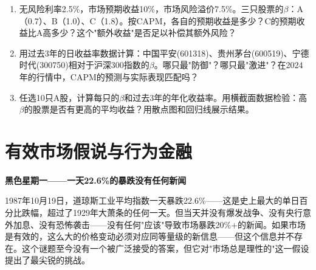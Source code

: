 \documentclass[a4paper,11pt]{ctexbook}
\begin{document}
{\begin{lessonsummary}
\begin{exercises}
\begin{enumerate}
  \item 无风险利率2.5\%，市场预期收益10\%，市场风险溢价7.5\%。三只股票的$\beta$：A（0.7）、B（1.0）、C（1.8）。按CAPM，各自的预期收益是多少？C的预期收益比A高多少？这个"额外收益"是否足以补偿其额外风险？
  \item 用过去3年的日收益率数据计算：中国平安(601318)、贵州茅台(600519)、宁德时代(300750)相对于沪深300指数的$\beta$。哪只最"防御"？哪只最"激进"？在2024年的行情中，CAPM的预测与实际表现匹配吗？
  \item 任选10只A股，计算每只的$\beta$和过去3年的年化收益率。用横截面数据检验：高$\beta$的股票是否有更高的平均收益？用散点图和回归线展示结果。
\end{enumerate}
\end{exercises}


\newpage
\chapter{有效市场假说与行为金融}

\begin{scenario}
\textbf{黑色星期一——一天22.6\%的暴跌没有任何新闻}

1987年10月19日，道琼斯工业平均指数一天暴跌22.6\%——这是史上最大的单日百分比跌幅，超过了1929年大萧条的任何一天。但当天并没有爆发战争、没有央行意外加息、没有恐怖袭击——没有任何"应该"导致市场暴跌20\%+的新闻。如果市场是有效的，这么大的价格变动必须对应同等量级的新信息——但这个信息并不存在。这个谜题至今没有一个被广泛接受的答案，但它对"市场总是理性的"这一假设提出了最尖锐的挑战。
\end{scenario}


\end{lessonsummary}}
\end{document}
